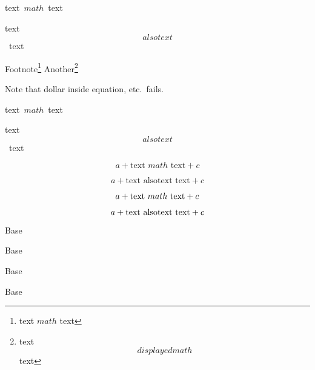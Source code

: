 \documentclass{article}
\begin{document}
\hbox{text $math$ text}

\hbox{text $$alsotext$$ text}

Footnote\footnote{text $math$ text}
Another\footnote{text $$displayedmath$$ text}

Note that dollar inside equation, etc.~fails.


\mbox{text $math$ text}

\mbox{text $$alsotext$$ text}

\[ a + \mbox{text $math$ text}  + c \]

\[ a + \mbox{text $$alsotext$$ text}  + c \]

\[ a + \makebox{text $math$ text}  + c \]

\[ a + \makebox{text $$alsotext$$ text}  + c \]

Base\raisebox{1em}{text $math$ text}

Base\raisebox{1em}{text $$alsotext$$ text}

Base

Base
\end{document}
